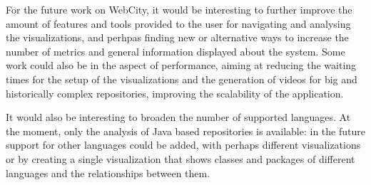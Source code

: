 \documentclass[]{usiinfbachelorproject}
\begin{document}
For the future work on WebCity, it would be interesting to further improve the amount of features and tools provided to the user for navigating and analysing the visualizations, and perhpas finding new or alternative ways to increase the number of metrics and general information displayed about the system.
Some work could also be in the aspect of performance, aiming at reducing the waiting times for the setup of the visualizations and the generation of videos for big and historically complex repositories, improving the scalability of the application.

It would also be interesting to broaden the number of supported languages. At the moment, only the analysis of Java based repositories is available: in the future support for other languages could be added, with perhaps different visualizations or by creating a single visualization that shows classes and packages of different languages and the relationships between them.
\end{document}
